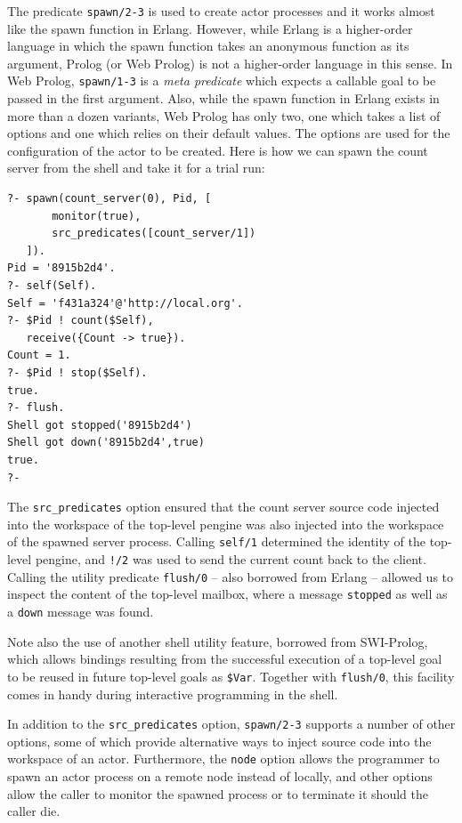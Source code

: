 \documentclass{tlp}
\begin{document}
The predicate \texttt{spawn/2-3} is used to create actor processes and it works almost like the spawn function in Erlang. However, while Erlang is a higher-order language in which the spawn function takes an anonymous function as its argument, Prolog (or Web Prolog) is not a higher-order language in this sense. In Web Prolog, \texttt{spawn/1-3} is a \textit{meta predicate} which expects a callable goal to be passed in the first argument. Also, while the spawn function in Erlang exists in more than a dozen variants, Web Prolog has only two, one which takes a list of options and one which relies on their default values. The options are used for the configuration of the actor to be created. Here is how we can spawn the count server from the shell and take it for a trial run:

\begin{lstlisting}
?- spawn(count_server(0), Pid, [
       monitor(true),
       src_predicates([count_server/1])
   ]).
Pid = '8915b2d4'.
?- self(Self).
Self = 'f431a324'@'http://local.org'.
?- $Pid ! count($Self),
   receive({Count -> true}).
Count = 1.
?- $Pid ! stop($Self).
true.
?- flush.
Shell got stopped('8915b2d4')
Shell got down('8915b2d4',true)
true.
?-
\end{lstlisting}

\noindent The \texttt{src\_predicates} option ensured that the count server source code injected into the workspace of the top-level pengine was also injected into the workspace of the spawned server process. Calling \texttt{self/1} determined the identity of the top-level pengine, and \texttt{!/2} was used to send the current count back to the client. Calling the utility predicate \texttt{flush/0} -- also borrowed from Erlang -- allowed us to inspect the content of the top-level mailbox, where a message \texttt{stopped} as well as a \texttt{down} message was found. 

Note also the use of another shell utility feature, borrowed from SWI-Prolog, which allows bindings resulting from the successful execution of a top-level goal to be reused in future top-level goals as \texttt{\$Var}. Together with \texttt{flush/0}, this facility comes in handy during interactive programming in the shell.

In addition to the \texttt{src\_predicates} option, \texttt{spawn/2-3} supports a number of other options, some of which provide alternative ways to inject source code into the workspace of an actor. Furthermore, the \texttt{node} option allows the programmer to spawn an actor process on a remote node instead of locally, and other options allow the caller to monitor the spawned process or to terminate it should the caller die.
\end{document}
